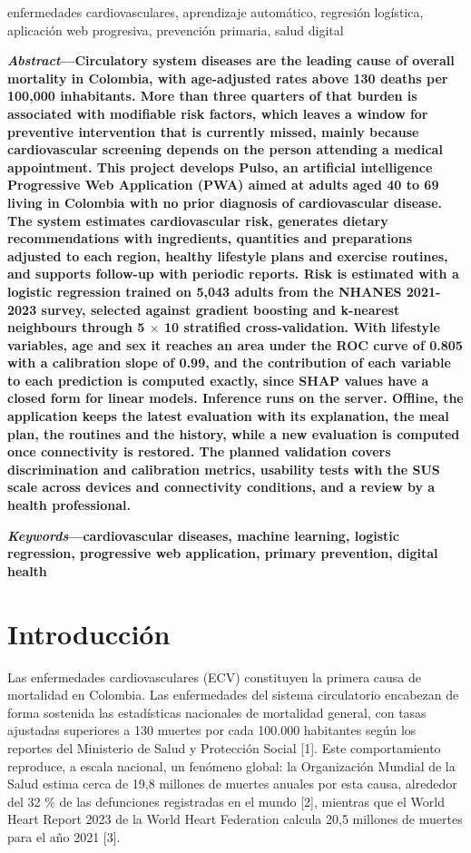 \documentclass[conference]{IEEEtran}
\begin{document}
\renewcommand{\IEEEkeywordsname}{Palabras clave}
\begin{IEEEkeywords}
enfermedades cardiovasculares, aprendizaje automático, regresión logística, aplicación web progresiva, prevención primaria, salud digital
\end{IEEEkeywords}
\noindent\textbf{\textit{Abstract}---Circulatory system diseases are the leading cause of overall mortality in Colombia, with age-adjusted rates above 130 deaths per 100{,}000 inhabitants. More than three quarters of that burden is associated with modifiable risk factors, which leaves a window for preventive intervention that is currently missed, mainly because cardiovascular screening depends on the person attending a medical appointment. This project develops Pulso, an artificial intelligence Progressive Web Application (PWA) aimed at adults aged 40 to 69 living in Colombia with no prior diagnosis of cardiovascular disease. The system estimates cardiovascular risk, generates dietary recommendations with ingredients, quantities and preparations adjusted to each region, healthy lifestyle plans and exercise routines, and supports follow-up with periodic reports. Risk is estimated with a logistic regression trained on 5{,}043 adults from the NHANES 2021-2023 survey, selected against gradient boosting and k-nearest neighbours through 5 $\times$ 10 stratified cross-validation. With lifestyle variables, age and sex it reaches an area under the ROC curve of 0.805 with a calibration slope of 0.99, and the contribution of each variable to each prediction is computed exactly, since SHAP values have a closed form for linear models. Inference runs on the server. Offline, the application keeps the latest evaluation with its explanation, the meal plan, the routines and the history, while a new evaluation is computed once connectivity is restored. The planned validation covers discrimination and calibration metrics, usability tests with the SUS scale across devices and connectivity conditions, and a review by a health professional.}

\noindent\textbf{\textit{Keywords}---cardiovascular diseases, machine learning, logistic regression, progressive web application, primary prevention, digital health}

\section{Introducción}
Las enfermedades cardiovasculares (ECV) constituyen la primera causa de mortalidad en Colombia. Las enfermedades del sistema circulatorio encabezan de forma sostenida las estadísticas nacionales de mortalidad general, con tasas ajustadas superiores a 130 muertes por cada 100.000 habitantes según los reportes del Ministerio de Salud y Protección Social [1]. Este comportamiento reproduce, a escala nacional, un fenómeno global: la Organización Mundial de la Salud estima cerca de 19{,}8 millones de muertes anuales por esta causa, alrededor del 32 \% de las defunciones registradas en el mundo [2], mientras que el World Heart Report 2023 de la World Heart Federation calcula 20{,}5 millones de muertes para el año 2021 [3].
\end{document}
